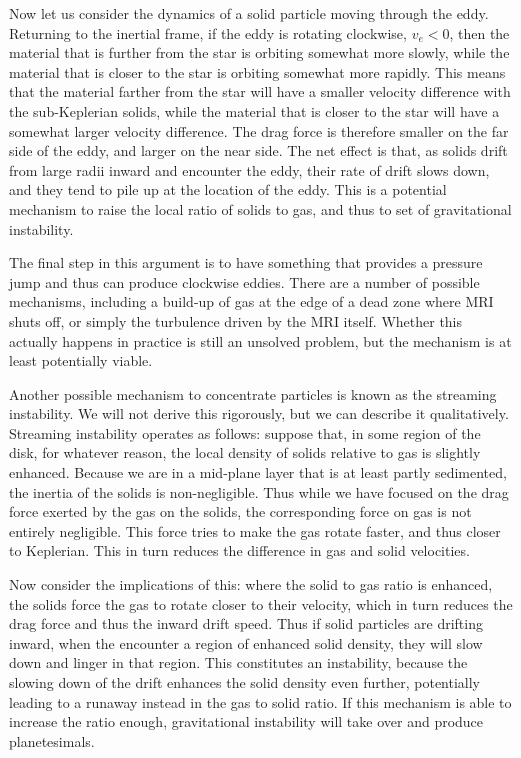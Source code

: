 Now let us consider the dynamics of a solid particle moving through the eddy. Returning to the inertial frame, if the eddy is rotating clockwise, $v_e < 0$, then the material that is further from the star is orbiting somewhat more slowly, while the material that is closer to the star is orbiting somewhat more rapidly. This means that the material farther from the star will have a smaller velocity difference with the sub-Keplerian solids, while the material that is closer to the star will have a somewhat larger velocity difference. The drag force is therefore smaller on the far side of the eddy, and larger on the near side. The net effect is that, as solids drift from large radii inward and encounter the eddy, their rate of drift slows down, and they tend to pile up at the location of the eddy. This is a potential mechanism to raise the local ratio of solids to gas, and thus to set of gravitational instability.

The final step in this argument is to have something that provides a pressure jump and thus can produce clockwise eddies. There are a number of possible mechanisms, including a build-up of gas at the edge of a dead zone where MRI shuts off, or simply the turbulence driven by the MRI itself. Whether this actually happens in practice is still an unsolved problem, but the mechanism is at least potentially viable.

Another possible mechanism to concentrate particles is known as the streaming instability. We will not derive this rigorously, but we can describe it qualitatively. Streaming instability operates as follows: suppose that, in some region of the disk, for whatever reason, the local density of solids relative to gas is slightly enhanced. Because we are in a mid-plane layer that is at least partly sedimented, the inertia of the solids is non-negligible. Thus while we have focused on the drag force exerted by the gas on the solids, the corresponding force on gas is not entirely negligible. This force tries to make the gas rotate faster, and thus closer to Keplerian. This in turn reduces the difference in gas and solid velocities.

Now consider the implications of this: where the solid to gas ratio is enhanced, the solids force the gas to rotate closer to their velocity, which in turn reduces the drag force and thus the inward drift speed. Thus if solid particles are drifting inward, when the encounter a region of enhanced solid density, they will slow down and linger in that region. This constitutes an instability, because the slowing down of the drift enhances the solid density even further, potentially leading to a runaway instead in the gas to solid ratio. If this mechanism is able to increase the ratio enough, gravitational instability will take over and produce planetesimals.




